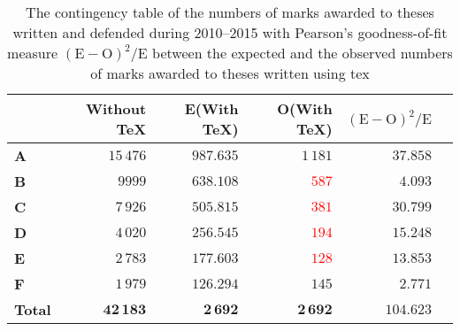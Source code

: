 \documentclass[12pt,twoside,cover,color,table]%
  {fithesis3/fithesis3/fithesis3} %
\begin{document}
  \begin{table}
    \caption{The contingency table of the numbers of marks awarded
      to theses written and defended during 2010--2015 with
      Pearson's goodness-of-fit measure
      $(\text{E}-\text{O})^2/\text{E}$ between the expected and the
      observed numbers of marks awarded to theses written using
      \gls{tex}}
    \begin{tabularx}{\textwidth}{Xrrrrr}
      &\textbf{Without \TeX}&E(\textbf{With \TeX})
      &O(\textbf{With \TeX})&$(\text{E}-\text{O})^2/\text{E}$
      \\ \toprule
      \textbf{\parbox[t]{1em}{\centering A}} 
        &$15\,476$&$987.635$&\textcolor{OliveGreen}{$1\,181$}&
        $37.858$\\
      \textbf{\parbox[t]{1em}{\centering B}}
        &$9999$&$638.108$&\textcolor{red}{$587$}&$4.093$\\
      \textbf{\parbox[t]{1em}{\centering C}}
        &$7\,926$&$505.815$&\textcolor{red}{$381$}&$30.799$\\
      \textbf{\parbox[t]{1em}{\centering D}}
        &$4\,020$&$256.545$&\textcolor{red}{$194$}&$15.248$\\
      \textbf{\parbox[t]{1em}{\centering E}}
        &$2\,783$&$177.603$&\textcolor{red}{$128$}&$13.853$\\
      \textbf{\parbox[t]{1em}{\centering F}}
        &$1\,979$&$126.294$&\textcolor{OliveGreen}{$145$}&
        $2.771$\\
      \bottomrule
      \textbf{Total} &$\mathbf{42\,183}$&$\mathbf{2\,692}$&
        $\mathbf{2\,692}$&$\mathbf{104.623}$
    \end{tabularx}
    \label{table:statistics-contingency}
  \end{table}
\end{document}
